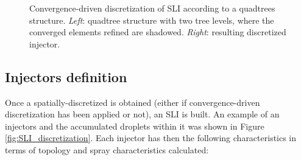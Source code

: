 \begin{figure}[h!]	
	\centering
	\caption[Convergence-driven discretization of SLI according to a quadtrees structure.]{Convergence-driven discretization of SLI according to a quadtrees structure. \textsl{Left}: quadtree structure with two tree levels, where the converged elements refined are shadowed. \textsl{Right}: resulting discretized injector. }
	\label{fig:quadtrees_tree_structure}
\end{figure}


%
%
%
%	
%	
%	
%	
%		
%	
%



\subsection{Injectors definition}
\label{subsec:ch4_injectors_definition}

Once a spatially-discretized is obtained (either if convergence-driven discretization has been applied or not), an SLI is built. An example of an injectors and the accumulated droplets within it was shown in Figure \ref{fig:SLI_discretization}. Each injector has then the following characteristics in terms of topology and spray characteristics calculated:

